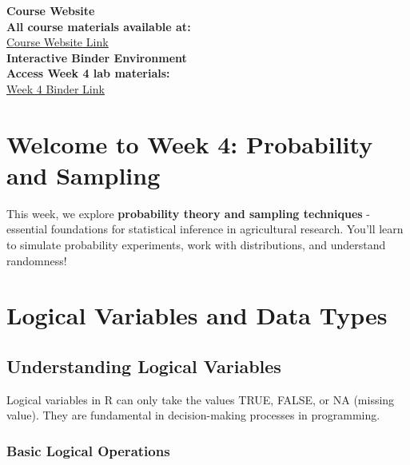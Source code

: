 \documentclass[11pt,a4paper]{article}
\begin{document}
\begin{tcolorbox}[colback=accentgreen!20, colframe=primarygreen, boxrule=2pt, arc=5pt, title={\textbf{\Large Essential Course Resources}}]
\centering
\textbf{\Large Course Website}\\[0.5cm]
\textcolor{primarygreen}{\textbf{All course materials available at:}}\\[0.3cm]
\href{https://mohammadrezanarimaniucdavis.github.io/PLS120-Statistics-Lab-Materials/}{\textcolor{primarygreen}{\underline{Course Website Link}}}\\[0.8cm]

\textbf{\Large Interactive Binder Environment}\\[0.5cm]
\textcolor{primarygreen}{\textbf{Access Week 4 lab materials:}}\\[0.3cm]
\href{https://mybinder.org/v2/gh/MohammadrezaNarimaniUCDavis/PLS120-Statistics-Lab-Materials/binder-week4}{\textcolor{primarygreen}{\underline{Week 4 Binder Link}}}
\end{tcolorbox}

\section{Welcome to Week 4: Probability and Sampling}

This week, we explore \textbf{probability theory and sampling techniques} - essential foundations for statistical inference in agricultural research. You'll learn to simulate probability experiments, work with distributions, and understand randomness!

\section{Logical Variables and Data Types}

\subsection{Understanding Logical Variables}

Logical variables in R can only take the values TRUE, FALSE, or NA (missing value). They are fundamental in decision-making processes in programming.

\subsubsection{Basic Logical Operations}
\end{document}
